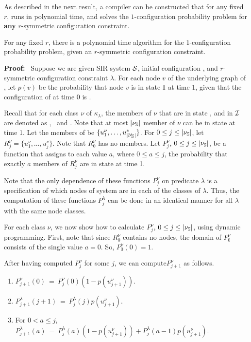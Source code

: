 As described in the next result, a compiler can be constructed
that for any fixed $r$, runs in polynomial time,
and solves the $1$-configuration probability problem
for {\bf any} $r$-symmetric configuration constraint.


\begin{theorem}  \label{th:one-step-forecasting}
For any fixed $r$, 
there is a polynomial time algorithm for 
the $1$-configuration probability problem,
given an $r$-symmetric configuration constraint.
\end{theorem}   

\noindent  
\textbf{Proof:}~   
Suppose we are given SIR system $\mbox{${\cal S}$}{}$, 
initial configuration \cali{},  and $r$-symmetric configuration constraint $\lambda$.
For each node $v$ of the underlying graph of \cals{},
let $p(v)$ be the probability that node $v$ is in
state $\mbox{$\mathbb{I}$}$ at time 1, given that the configuration of \cals{}
at time 0 is \cali.

Recall that for each class $\nu$ of $\kappa_{\lambda}$,
the members of $\nu$ that are in state 
\sstate, \istate{} and \rstate{} in $\mbox{${\cal I}$}$
are denoted as \nus{},~ \nui{} and \nur{} . 
Note that at most $|\mbox{$\nu_{\mathbb{S}}$}|$ member of $\nu$ 
can be in state \istate{}  at time 1.
Let the members of \nus{} be $\{u^{\nu}_1, \ldots, u^{\nu}_{|\mbox{$\nu_{\mathbb{S}}$}|}\}$.  
For $0 \leq j \leq |\mbox{$\nu_{\mathbb{S}}$}|$, 
let $R^{\nu}_j = \{u^{\nu}_1, \ldots, u^{\nu}_j\}$.
Note that $R^{\nu}_0$ has no members.
Let $P_j^{\nu}$, $0 \leq j \leq |\mbox{$\nu_{\mathbb{S}}$}|$, 
be a function that assigns to each  value $a$, where $0 \leq a \leq j$,
the probability that exactly $a$ members of  $R^{\nu}_j$ 
are in state \istate{}  at time 1.

Note that the only dependence of these functions $P_j^\nu$
on predicate $\lambda$ is a specification of which nodes of system \cals{} 
are in each of the classes of $\lambda$.
Thus, the computation of these functions $P_j^\lambda$ 
can be done in an identical manner for
all $\lambda$ with the same node classes.

For each class $\nu$, we now show how to calculate $P_j^\nu$, $0 \leq j \leq  |\mbox{$\nu_{\mathbb{S}}$}|$,
using dynamic programming.
First, note that since $R_0^\nu$ contains no nodes,
the domain of $P_0^\nu$ consists of the single value $a = 0$.
So, $P_0^\nu(0) = 1$.

After having computed $P_j^\nu$ for some $j$,
we can compute$P_{j+1}^\nu$ as follows.

\begin{enumerate}
\item 
$P_{j+1}^\nu(0) ~=~ P_j^\nu(0) (1 - p(u^{\nu}_{j+1}))$.  

\item  
$P_{j+1}^\lambda(j+1) ~=~ P_j^\lambda(j) p(u^{\nu}_{j+1})$.  

\item For $0 < a \leq j$,
$P_{j+1}^\lambda(a) ~=~ P_j^\lambda(a) (1 - p(u^{\nu}_{j+1})) 
                        + P_j^\lambda(a-1) p(u^{\nu}_{j+1})$.
\end{enumerate}

